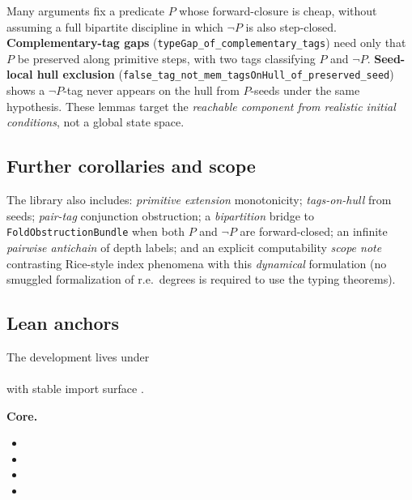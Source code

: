 \documentclass[11pt]{article}
\theoremstyle{plain}
\theoremstyle{definition}
\theoremstyle{remark}
\begin{document}
\begin{keybox}[title={One-sided preservation is often enough}]
Many arguments fix a predicate $P$ whose forward-closure is cheap, without assuming a full
bipartite discipline in which $\neg P$ is also step-closed.  \textbf{Complementary-tag gaps}
(\texttt{typeGap\_of\_complementary\_tags}) need only that $P$ be preserved along primitive
steps, with two tags classifying $P$ and $\neg P$.  \textbf{Seed-local hull exclusion}
(\texttt{false\_tag\_not\_mem\_tagsOnHull\_of\_preserved\_seed}) shows a $\neg P$-tag never
appears on the hull from $P$-seeds under the same hypothesis.  These lemmas target the
\emph{reachable component from realistic initial conditions}, not a global state space.
\end{keybox}

\subsection*{Further corollaries and scope}

The library also includes: \emph{primitive extension} monotonicity; \emph{tags-on-hull}
from seeds; \emph{pair-tag} conjunction obstruction; a \emph{bipartition} bridge to
\texttt{FoldObstructionBundle} when both $P$ and $\neg P$ are forward-closed; an infinite
\emph{pairwise antichain} of depth labels; and an explicit computability \emph{scope note}
contrasting Rice-style index phenomena with this \emph{dynamical} formulation (no
smuggled formalization of r.e.\ degrees is required to use the typing theorems).

\subsection*{Lean anchors}

\noindent
The development lives under\\
\\
with stable import surface .

\smallskip
\noindent\textbf{Core.}
\begin{itemize}[nosep,leftmargin=1.5em]
  \item {}
  \item {}
  \item {}
  \item {}
\end{itemize}
\end{document}
